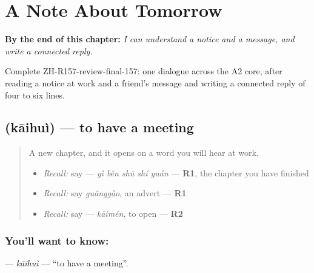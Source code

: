 
\chapter{A Note About Tomorrow}
\label{ch:zh-a-note-about-tomorrow}

\begin{chapteropening}
\textbf{By the end of this chapter:} \emph{I can understand a notice and a message, and write a connected reply.}

Complete ZH-R157-review-final-157: one dialogue across the A2 core, after reading a notice at work and a friend's message and writing a connected reply of four to six lines.
\end{chapteropening}

\section[\texorpdfstring{\zh{开会} (kāihuì)}{开会 (kāihuì)}]{ (kāihuì) — to have a meeting}

\label{lesson:ZH-C157-kaihui}



\begin{quote}
A new chapter, and it opens on a word you will hear at work.

\begin{itemize}
\raggedright
  \item \emph{Recall:} say  — \emph{yì běn shū shí yuán} — \textbf{R1}, the chapter you have finished
  \item \emph{Recall:} say \emph{guǎnggào}, an advert — \textbf{R1}
  \item \emph{Recall:} say  — \emph{kāimén}, to open — \textbf{R2}
\end{itemize}
\end{quote}

\subsection*{You'll want to know: }
\textbf{} — \emph{kāihuì} — \textquotedblleft{}to have a meeting\textquotedblright{}.

